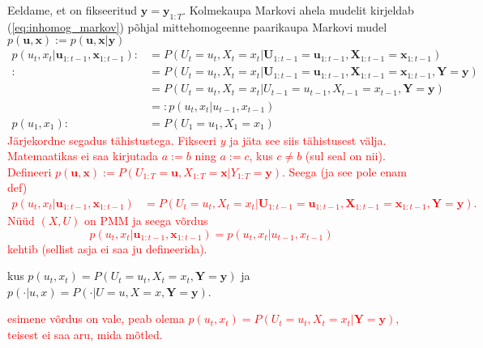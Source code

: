 Eeldame, et on fikseeritud $\mathbf{y} = \mathbf{y}_{1:T}$. Kolmekaupa Markovi ahela mudelit kirjeldab (\ref{eq:inhomog_markov}) põhjal mittehomogeenne paarikaupa Markovi mudel $ p(\bm{u},\bm{x}) := p(\bm{u},\bm{x} | \bm{y})$
\begin{align}
    \nonumber
    p(u_{t}, x_{t} | \bm{u}_{1:t-1}, \bm{x}_{1:t-1} ) :&= P(U_{t} = u_{t}, X_{t} = x_{t} | \bm{U}_{1:t-1} = \bm{u}_{1:t-1}, \bm{X}_{1:t-1}=\bm{x}_{1:t-1}) \\
    \nonumber
    :&= P(U_{t} = u_{t}, X_{t} = x_{t} | \bm{U}_{1:t-1} = \bm{u}_{1:t-1}, \bm{X}_{1:t-1}=\bm{x}_{1:t-1}, \bm{Y} = \bm{y})
    \\
    \nonumber
    &= P(U_{t} = u_{t}, X_{t} = x_{t} | U_{t-1} = u_{t-1}, X_{t-1}=x_{t-1},\bm{Y}=\bm{y}) \\
    \label{eq:model2_1}
    &=: p(u_{t}, x_{t} | u_{t-1}, x_{t-1})
    \\
    \label{eq:model2_2}
    p(u_1,x_1) :&= P(U_1 = u_1, X_1 = x_1)
\end{align}
\textcolor{red}{Järjekordne segadus tähistustega. Fikseeri $y$ ja jäta see siis tähistusest välja. Matemaatikas ei saa kirjutada $a:=b$ ning $a:=c$, kus $c\ne b$ (sul seal on nii). Defineeri $p(\bm{u},\bm{x}):=P(U_{1:T}=\bm{u},X_{1:T}=\bm{x}|Y_{1:T}=\bm{y}) $. Seega (ja see pole enam def)
    \nonumber
    \begin{align*}
    p(u_{t}, x_{t} | \bm{u}_{1:t-1}, \bm{x}_{1:t-1} ) &= P(U_{t} = u_{t}, X_{t} = x_{t} | \bm{U}_{1:t-1} = \bm{u}_{1:t-1}, \bm{X}_{1:t-1}=\bm{x}_{1:t-1}, \bm{Y} = \bm{y}).
\end{align*}
Nüüd $(X,U)$ on PMM ja seega võrdus $$ p(u_{t}, x_{t} | \bm{u}_{1:t-1}, \bm{x}_{1:t-1} )=p(u_{t}, x_{t} | u_{t-1}, x_{t-1})$$
kehtib (sellist asja ei saa ju defineerida).}

kus $p(u_{t},x_{t}) = P(U_{t} = u_{t}, X_{t} = x_{t}, \bm{Y}=\bm{y})$ ja $p(\cdot|u,x) = P(\cdot | U = u, X=x, \bm{Y}=\bm{y})$. 

\textcolor{red}{esimene võrdus on vale, peab olema $p(u_{t},x_{t}) = P(U_{t} = u_{t}, X_{t} = x_{t}| \bm{Y}=\bm{y})$, teisest ei saa aru, mida mõtled. }



